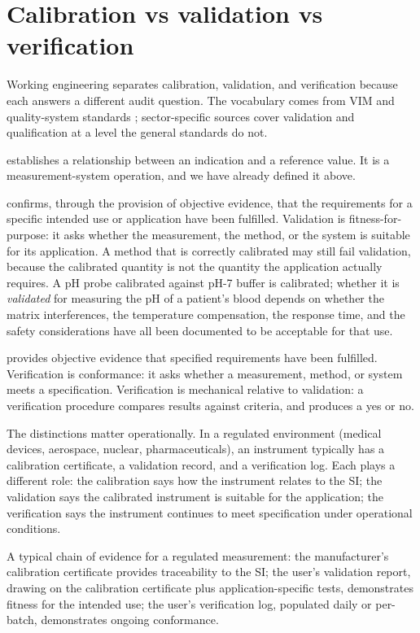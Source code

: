 \section{Calibration vs validation vs verification}

Working engineering separates calibration, validation, and
verification because each answers a different audit question. The
vocabulary comes from VIM and quality-system standards
\cite{std:jcgm-vim}; sector-specific sources cover validation and
qualification at a level the general standards do not.

 establishes a relationship between an
indication and a reference value. It is a measurement-system
operation, and we have already defined it above.

 confirms, through the provision of objective
evidence, that the requirements for a specific intended use or
application have been fulfilled. Validation is fitness-for-purpose:
it asks whether the measurement, the method, or the system is
suitable for its application. A method that is correctly calibrated
may still fail validation, because the calibrated quantity is not
the quantity the application actually requires. A pH probe
calibrated against pH-7 buffer is calibrated; whether it is
\emph{validated} for measuring the pH of a patient's blood depends
on whether the matrix interferences, the temperature compensation,
the response time, and the safety considerations have all been
documented to be acceptable for that use.

 provides objective evidence that specified
requirements have been fulfilled. Verification is conformance: it
asks whether a measurement, method, or system meets a specification.
Verification is mechanical relative to validation: a verification
procedure compares results against criteria, and produces a yes
or no.

The distinctions matter operationally. In a regulated environment
(medical devices, aerospace, nuclear, pharmaceuticals), an
instrument typically has a calibration certificate, a validation
record, and a verification log. Each plays a different role: the
calibration says how the instrument relates to the SI; the
validation says the calibrated instrument is suitable for the
application; the verification says the instrument continues to
meet specification under operational conditions.

A typical chain of evidence for a regulated measurement: the
manufacturer's calibration certificate provides traceability to the
SI; the user's validation report, drawing on the calibration
certificate plus application-specific tests, demonstrates fitness
for the intended use; the user's verification log, populated daily
or per-batch, demonstrates ongoing conformance.

